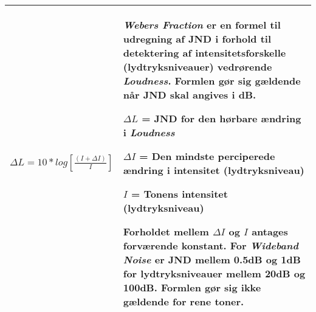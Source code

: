 \begin{tabularx}{\textwidth}{ |X|X| }
  \hline
  \bigskip
  \(\displaystyle \Delta L = 10*log\left[\frac{(I+\Delta I)}{I}\right]\) 
  &
  \textit{Webers Fraction} er en formel til udregning af JND i forhold til detektering af intensitetsforskelle (lydtryksniveauer) vedrørende \textit{Loudness}. Formlen gør sig gældende når JND skal angives i dB.
  
  \bigskip
  $\Delta L$ = JND for den hørbare ændring i \textit{Loudness}
  
  \noindent 
  $\Delta I$ = Den mindste perciperede ændring i intensitet (lydtryksniveau)
  
  \noindent
  $I$ = Tonens intensitet (lydtryksniveau)
  \noindent
    
  \bigskip
  Forholdet mellem $\Delta I$ og $I$ antages forværende konstant. For \textit{Wideband Noise} er JND mellem 0.5dB og 1dB for lydtryksniveauer mellem 20dB og 100dB. Formlen gør sig ikke gældende for rene toner.\\
  \hline
\end{tabularx}


